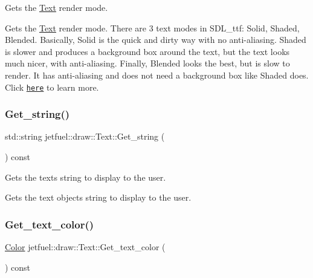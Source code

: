 Gets the \hyperlink{classjetfuel_1_1draw_1_1Text}{Text} render mode. 

Gets the \hyperlink{classjetfuel_1_1draw_1_1Text}{Text} render mode. There are 3 text modes in S\+D\+L\+\_\+ttf\+: Solid, Shaded, Blended. Basically, Solid is the quick and dirty way with no anti-\/aliasing. Shaded is slower and produces a background box around the text, but the text looks much nicer, with anti-\/aliasing. Finally, Blended looks the best, but is slow to render. It has anti-\/aliasing and does not need a background box like Shaded does. Click \href{http://bit.ly/2tvlJUk}{\tt here} to learn more. \mbox{\label{classjetfuel_1_1draw_1_1Text_aff24355889167e97455750066ff8ded0}} 
\subsubsection{\texorpdfstring{Get\+\_\+string()}{Get\_string()}}
{\footnotesize\ttfamily std\+::string jetfuel\+::draw\+::\+Text\+::\+Get\+\_\+string (\begin{DoxyParamCaption}{ }\end{DoxyParamCaption}) const\hspace{0.3cm}{\ttfamily [inline]}}



Gets the text\textquotesingle{}s string to display to the user. 

Gets the text object\textquotesingle{}s string to display to the user. \mbox{\label{classjetfuel_1_1draw_1_1Text_a213dcf0fc15038eeaca73547d6c252db}} 
\subsubsection{\texorpdfstring{Get\+\_\+text\+\_\+color()}{Get\_text\_color()}}
{\footnotesize\ttfamily \hyperlink{classjetfuel_1_1draw_1_1Color}{Color} jetfuel\+::draw\+::\+Text\+::\+Get\+\_\+text\+\_\+color (\begin{DoxyParamCaption}{ }\end{DoxyParamCaption}) const\hspace{0.3cm}{\ttfamily [inline]}}



